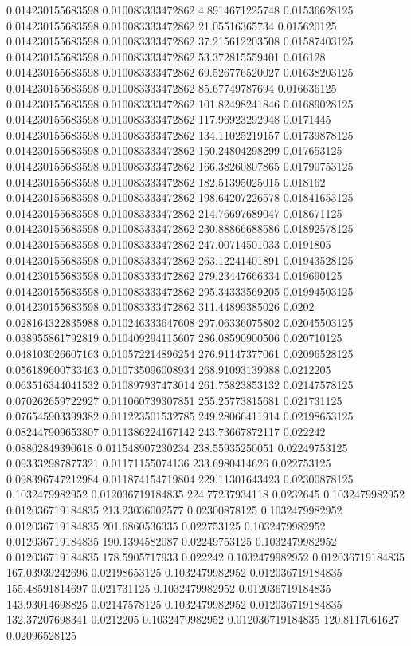 0.014230155683598 0.010083333472862 4.8914671225748 0.01536628125
0.014230155683598 0.010083333472862 21.05516365734 0.015620125
0.014230155683598 0.010083333472862 37.215612203508 0.01587403125
0.014230155683598 0.010083333472862 53.372815559401 0.016128
0.014230155683598 0.010083333472862 69.526776520027 0.01638203125
0.014230155683598 0.010083333472862 85.67749787694 0.016636125
0.014230155683598 0.010083333472862 101.82498241846 0.01689028125
0.014230155683598 0.010083333472862 117.96923292948 0.0171445
0.014230155683598 0.010083333472862 134.11025219157 0.01739878125
0.014230155683598 0.010083333472862 150.24804298299 0.017653125
0.014230155683598 0.010083333472862 166.38260807865 0.01790753125
0.014230155683598 0.010083333472862 182.51395025015 0.018162
0.014230155683598 0.010083333472862 198.64207226578 0.01841653125
0.014230155683598 0.010083333472862 214.76697689047 0.018671125
0.014230155683598 0.010083333472862 230.88866688586 0.01892578125
0.014230155683598 0.010083333472862 247.00714501033 0.0191805
0.014230155683598 0.010083333472862 263.12241401891 0.01943528125
0.014230155683598 0.010083333472862 279.23447666334 0.019690125
0.014230155683598 0.010083333472862 295.34333569205 0.01994503125
0.014230155683598 0.010083333472862 311.44899385026 0.0202
0.028164322835988 0.010246333647608 297.06336075802 0.02045503125
0.038955861792819 0.010409294115607 286.08590900506 0.020710125
0.048103026607163 0.010572214896254 276.91147377061 0.02096528125
0.056189600733463 0.010735096008934 268.91093139988 0.0212205
0.063516344041532 0.010897937473014 261.75823853132 0.02147578125
0.070262659722927 0.011060739307851 255.25773815681 0.021731125
0.076545903399382 0.011223501532785 249.28066411914 0.02198653125
0.082447909653807 0.011386224167142 243.73667872117 0.022242
0.08802849390618 0.011548907230234 238.55935250051 0.02249753125
0.093332987877321 0.01171155074136 233.6980414626 0.022753125
0.098396747212984 0.011874154719804 229.11301643423 0.02300878125
0.1032479982952 0.012036719184835 224.77237934118 0.0232645
0.1032479982952 0.012036719184835 213.23036002577 0.02300878125
0.1032479982952 0.012036719184835 201.6860536335 0.022753125
0.1032479982952 0.012036719184835 190.1394582087 0.02249753125
0.1032479982952 0.012036719184835 178.5905717933 0.022242
0.1032479982952 0.012036719184835 167.03939242696 0.02198653125
0.1032479982952 0.012036719184835 155.48591814697 0.021731125
0.1032479982952 0.012036719184835 143.93014698825 0.02147578125
0.1032479982952 0.012036719184835 132.37207698341 0.0212205
0.1032479982952 0.012036719184835 120.8117061627 0.02096528125
